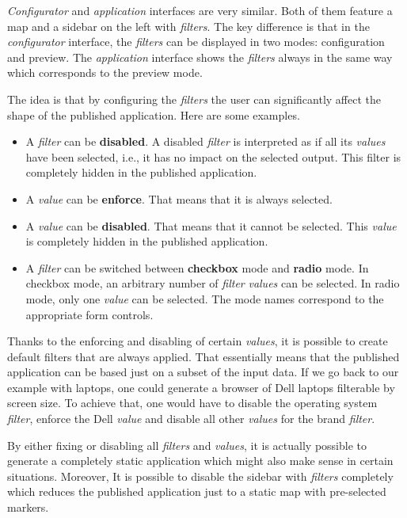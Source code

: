 \emph{Configurator} and \emph{application} interfaces are very similar. Both of them feature a map and a sidebar on the left with \emph{filters}. The key difference is that in the \emph{configurator} interface, the \emph{filters} can be displayed in two modes: configuration and preview. The \emph{application} interface shows the \emph{filters} always in the same way which corresponds to the preview mode.

The idea is that by configuring the \emph{filters} the user can significantly affect the shape of the published application. Here are some examples.

\begin{itemize}
\item A \emph{filter} can be \textbf{disabled}. A disabled \emph{filter} is interpreted as if all its \emph{values} have been selected, i.e., it has no impact on the selected output. This filter is completely hidden in the published application.
\item A \emph{value} can be \textbf{enforce}. That means that it is always selected.
\item A \emph{value} can be \textbf{disabled}. That means that it cannot be selected. This \emph{value} is completely hidden in the published application.
\item A \emph{filter} can be switched between \textbf{checkbox} mode and \textbf{radio} mode. In checkbox mode, an arbitrary number of \emph{filter} \emph{values} can be selected. In radio mode, only one \emph{value} can be selected. The mode names correspond to the appropriate form controls.

\end{itemize}
Thanks to the enforcing and disabling of certain \emph{values}, it is possible to create default filters that are always applied. That essentially means that the published application can be based just on a subset of the input data. If we go back to our example with laptops, one could generate a browser of Dell laptops filterable by screen size. To achieve that, one would have to disable the operating system \emph{filter}, enforce the Dell \emph{value} and disable all other \emph{values} for the brand \emph{filter}.

By either fixing or disabling all \emph{filters} and \emph{values}, it is actually possible to generate a completely static application which might also make sense in certain situations. Moreover, It is possible to disable the sidebar with \emph{filters} completely which reduces the published application just to a static map with pre-selected markers.

